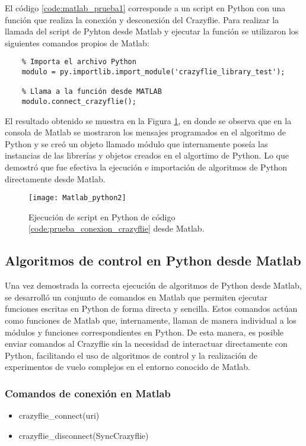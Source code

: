 El código \ref{code:matlab_prueba1} corresponde a un script en Python con una función que realiza la conexión y desconexión del Crazyflie. Para realizar la llamada del script de Pyhton desde Matlab y ejecutar la función se utilizaron los siguientes comandos propios de Matlab:

\begin{verbatim}
	% Importa el archivo Python
	modulo = py.importlib.import_module('crazyflie_library_test');
	
	% Llama a la función desde MATLAB
	modulo.connect_crazyflie();
\end{verbatim}

El resultado obtenido se muestra en la Figura \ref{fig:Matlab_python2}, en donde se observa que en la consola de Matlab se mostraron los mensajes programados en el algoritmo de Python y se creó un objeto llamado módulo que internamente poseía las instancias de las librerías y objetos creados en el algortimo de Python. Lo que demostró que fue efectiva la ejecución e importación de algoritmos de Python directamente desde Matlab.

\vspace{5mm}
\begin{figure}[htbp]
	\centering
	\texttt{[image: Matlab\_python2]}
	\caption{Ejecución de script en Python de código \ref{code:prueba_conexion_crazyflie} desde Matlab.}
	\label{fig:Matlab_python2}
\end{figure} 

\subsection{Algoritmos de control en Python desde Matlab}
Una vez demostrada la correcta ejecución de algoritmos de Python desde Matlab, se desarrolló un conjunto de comandos en Matlab que permiten ejecutar funciones escritas en Python de forma directa y sencilla. Estos comandos actúan como funciones de Matlab que, internamente, llaman de manera individual a los módulos y funciones correspondientes en Python. De esta manera, es posible enviar comandos al Crazyflie sin la necesidad de interactuar directamente con Python, facilitando el uso de algoritmos de control y la realización de experimentos de vuelo complejos en el entorno conocido de Matlab.

\subsubsection{Comandos de conexión en Matlab}
\begin{itemize}
	\item crazyflie\_connect(uri)
	\item crazyflie\_disconnect(SyncCrazyflie)
\end{itemize}

